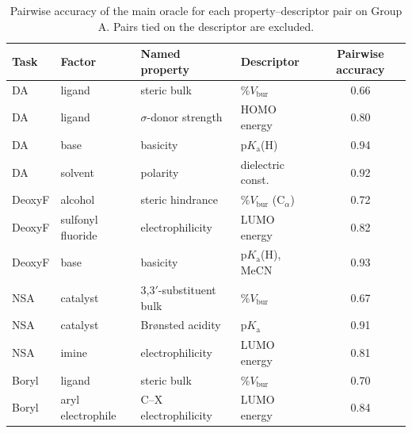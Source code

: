 \begin{table}[t]
\centering
\small
\setlength{\tabcolsep}{6pt}
\begin{tabular}{@{}l l l l c@{}}
\toprule
Task & Factor & Named property & Descriptor & Pairwise accuracy \\
\midrule
DA & ligand & steric bulk & \%$V_\mathrm{bur}$ & 0.66 \\
DA & ligand & $\sigma$-donor strength & HOMO energy & 0.80 \\
DA & base & basicity & p$K_\mathrm{a}$(H) & 0.94 \\
DA & solvent & polarity & dielectric const. & 0.92 \\
DeoxyF & alcohol & steric hindrance & \%$V_\mathrm{bur}$ (C$_\alpha$) & 0.72 \\
DeoxyF & sulfonyl fluoride & electrophilicity & LUMO energy & 0.82 \\
DeoxyF & base & basicity & p$K_\mathrm{a}$(H), MeCN & 0.93 \\
NSA & catalyst & 3,3$'$-substituent bulk & \%$V_\mathrm{bur}$ & 0.67 \\
NSA & catalyst & Br{\o}nsted acidity & p$K_\mathrm{a}$ & 0.91 \\
NSA & imine & electrophilicity & LUMO energy & 0.81 \\
Boryl & ligand & steric bulk & \%$V_\mathrm{bur}$ & 0.70 \\
Boryl & aryl electrophile & C--X electrophilicity & LUMO energy & 0.84 \\
\bottomrule
\end{tabular}
\caption{Pairwise accuracy of the main oracle for each property--descriptor pair on Group A. Pairs tied on the descriptor are excluded.}
\label{tab:rq0prop}
\end{table}
